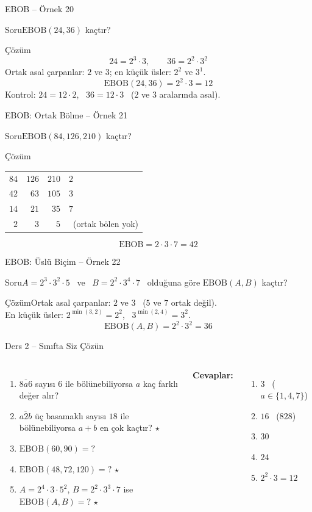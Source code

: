 \documentclass[aspectratio=169,11pt]{beamer}
\newcommand{\soru}[3]{%
\begin{frame}{#1}
  \begin{block}{Soru}\large #2\end{block}
  \pause
  \begin{exampleblock}{Çözüm}\large #3\end{exampleblock}
\end{frame}}
\newcommand{\ab}[1]{\overline{#1}}
\begin{document}
\soru{EBOB -- Örnek 20}
{\(\text{EBOB}(24,36)\) kaçtır?}
{\[24=2^3\cdot 3,\qquad 36=2^2\cdot 3^2\]
Ortak asal çarpanlar: \(2\) ve \(3\); en küçük üsler: \(2^2\) ve \(3^1\).
\[\text{EBOB}(24,36)=2^2\cdot 3=12\]
Kontrol: \(24=12\cdot 2\), \ \(36=12\cdot 3\) \ (\(2\) ve \(3\) aralarında asal).}

\soru{EBOB: Ortak Bölme -- Örnek 21}
{\(\text{EBOB}(84,126,210)\) kaçtır?}
{{\normalsize
\begin{tabular}{rrr|l}
\(84\) & \(126\) & \(210\) & \(2\)\\
\(42\) & \(63\) & \(105\) & \(3\)\\
\(14\) & \(21\) & \(35\) & \(7\)\\
\(2\) & \(3\) & \(5\) & \ (ortak bölen yok)
\end{tabular}}
\[\text{EBOB}=2\cdot 3\cdot 7=42\]}

\soru{EBOB: Üslü Biçim -- Örnek 22}
{\(A=2^3\cdot 3^2\cdot 5\) \ ve \ \(B=2^2\cdot 3^4\cdot 7\) \ olduğuna göre \(\text{EBOB}(A,B)\) kaçtır?}
{Ortak asal çarpanlar: \(2\) ve \(3\) \ (\(5\) ve \(7\) ortak değil).\\[3pt]
En küçük üsler: \(2^{\min(3,2)}=2^2\), \ \(3^{\min(2,4)}=3^2\).
\[\text{EBOB}(A,B)=2^2\cdot 3^2=36\]}

\begin{frame}{Ders 2 -- Sınıfta Siz Çözün}
\begin{columns}[t]
\begin{enumerate}
\item \(\ab{8a6}\) sayısı \(6\) ile bölünebiliyorsa \(a\) kaç farklı değer alır?
\item \(\ab{a2b}\) üç basamaklı sayısı \(18\) ile bölünebiliyorsa \(a+b\) en çok kaçtır? \(\star\)
\item \(\text{EBOB}(60,90)=?\)
\item \(\text{EBOB}(48,72,120)=?\) \(\star\)
\item \(A=2^4\cdot 3\cdot 5^2\), \(B=2^2\cdot 3^3\cdot 7\) ise \(\text{EBOB}(A,B)=?\) \(\star\)
\end{enumerate}
\pause
\textbf{Cevaplar:}
\begin{enumerate}
\item \(3\) \ (\(a\in\{1,4,7\}\))
\item \(16\) \ (\(828\))
\item \(30\)
\item \(24\)
\item \(2^2\cdot 3=12\)
\end{enumerate}
\end{columns}
\vspace{4pt}{\footnotesize \(\star\) işaretli soruların adım adım çözümü sonraki slaytlardadır.}
\end{frame}
\end{document}
